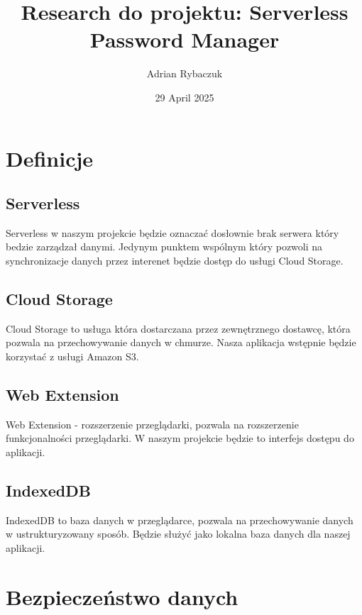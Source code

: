 \documentclass[11pt, a4paper]{article}
\begin{document}
\title{Research do projektu: Serverless Password Manager}
\author{Adrian Rybaczuk}
\date{29 April 2025}
\maketitle

\tableofcontents

\newpage

\section{Definicje}
\subsection{Serverless}

Serverless w naszym projekcie będzie oznaczać dosłownie brak serwera który bedzie zarządzał danymi.
Jedynym punktem wspólnym który pozwoli na synchronizacje danych przez interenet będzie dostęp do usługi Cloud Storage.

\subsection{Cloud Storage}

Cloud Storage to usługa która dostarczana przez zewnętrznego dostawcę, która pozwala na przechowywanie danych w chmurze.
Nasza aplikacja wstępnie będzie korzystać z usługi Amazon S3.

\subsection{Web Extension}

Web Extension - rozszerzenie przeglądarki, pozwala na rozszerzenie funkcjonalności przeglądarki. 
W naszym projekcie będzie to interfejs dostępu do aplikacji.

\subsection{IndexedDB}

IndexedDB to baza danych w przeglądarce, pozwala na przechowywanie danych w ustrukturyzowany sposób.
Będzie służyć jako lokalna baza danych dla naszej aplikacji.

\newpage

\section{Bezpieczeństwo danych}
\end{document}
